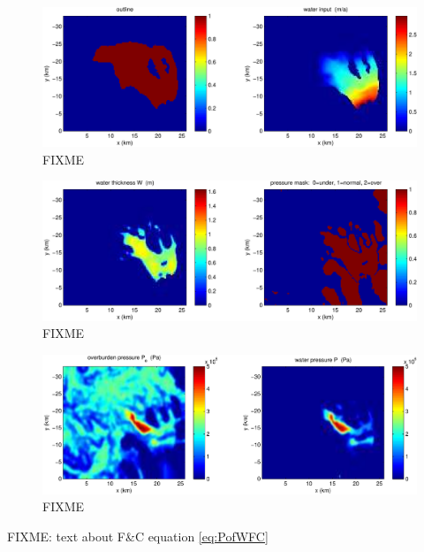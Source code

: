\documentclass[11pt,final]{amsart}%
\begin{document}
\begin{figure}[ht]
\includegraphics[width=7.0in,keepaspectratio=true]{figs/outline-input-250m}
\caption{FIXME}
\end{figure}

\begin{figure}[ht]
\includegraphics[width=7.0in,keepaspectratio=true]{figs/W-Pmask-250m}
\caption{FIXME}
\end{figure}

\begin{figure}[ht]
\includegraphics[width=7.0in,keepaspectratio=true]{figs/Po-P-250m}
\caption{FIXME}
\end{figure}

FIXME:  text about F\&C equation \eqref{eq:PofWFC}
\end{document}
